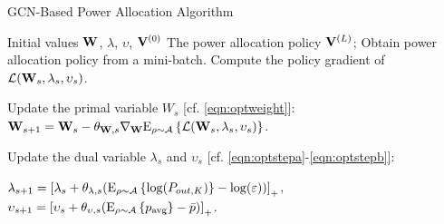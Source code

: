 \documentclass[conference]{IEEEtran}
\begin{document}
\renewcommand{\algorithmicrequire}{\textbf{Input:}}  %
\renewcommand{\algorithmicensure}{\textbf{Output:}} %

\begin{algorithm}[h]
  \caption{GCN-Based Power Allocation Algorithm} %
  \label{alg:algor1}
  \begin{algorithmic}[1]
    \Require
        Initial values $\bf W$, $\lambda$, $\upsilon$, ${\bf V}^{(0)}$
    \Ensure
        The power allocation policy ${\bf V}^{(L)}$;
        \State Obtain  power allocation policy from a mini-batch.
        \State Compute the policy gradient of ${\cal L}({{\bf{W}}_s},{\lambda _s},{\upsilon _s})$.

        \State Update the primal variable $W_{s}$ [cf. \eqref{eqn:optweight}]:
        \Statex \hspace{0.68cm}${{\bf{W}}_{s + 1}} = {{\bf{W}}_s} - {\theta _{{\bf{W}},s}} {\nabla _{\bf{W}}}{{\rm E}_{\rho  \sim \mathcal A}}\left\{\mathcal L({{\bf{W}}_s},{\lambda_s} ,{\upsilon_s})\right\}$.

        \State Update the dual variable $\lambda _{s}$ and $\upsilon _{s}$ [cf. \eqref{eqn:optstepa}-\eqref{eqn:optstepb}]:

        \Statex \hspace{0.68cm}${\lambda _{s + 1}} = {\left[ {{\lambda _s} + {\theta _{{\lambda },s}}({{\rm E}_{\rho  \sim \mathcal A}}\left\{\log ({P_{out,K}})\right\} - \log (\varepsilon))} \right]_ + }$,
        \Statex \hspace{0.68cm}${\upsilon _{s + 1}} = {\left[ {{\upsilon _s} + {\theta _{{\upsilon },s}}({{\rm E}_{\rho  \sim \mathcal A}}\left\{p_{\rm avg}\right\} - \bar p)} \right]_ + }$.
    \EndFor
  \end{algorithmic}
\end{algorithm}
\end{document}
